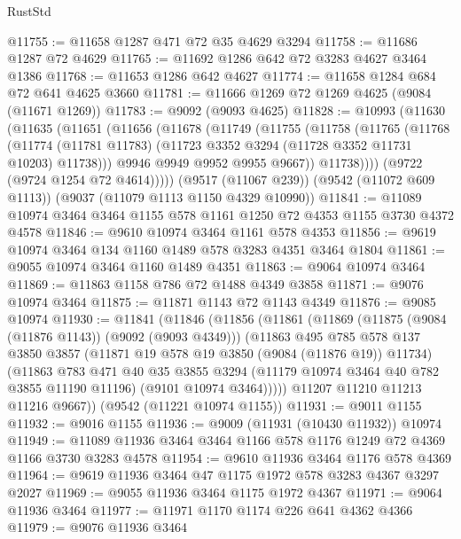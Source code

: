 \begin{lexlean}{RustStd}
\begin{coremodule}
@11755 := @11658 @1287 @471 @72 @35 @4629 @3294
@11758 := @11686 @1287 @72 @4629
@11765 := @11692 @1286 @642 @72 @3283 @4627 @3464 @1386
@11768 := @11653 @1286 @642 @4627
@11774 := @11658 @1284 @684 @72 @641 @4625 @3660
@11781 := @11666 @1269 @72 @1269 @4625 (@9084 (@11671 @1269))
@11783 := @9092 (@9093 @4625)
@11828 := @10993
    (@11630
      (@11635
        (@11651
          (@11656
            (@11678
              (@11749
                (@11755
                  (@11758
                    (@11765
                      (@11768
                        (@11774
                          (@11781 @11783)
                          (@11723 @3352 @3294 (@11728 @3352 @11731 @10203) @11738)))
                      @9946
                      @9949
                      @9952
                      @9955
                      @9667))
                  @11738))))
          (@9722 (@9724 @1254 @72 @4614)))))
    (@9517 (@11067 @239))
    (@9542 (@11072 @609 @1113))
    (@9037 (@11079 @1113 @1150 @4329 @10990))
@11841 := @11089 @10974 @3464 @3464 @1155 @578 @1161 @1250 @72 @4353 @1155 @3730 @4372 @4578
@11846 := @9610 @10974 @3464 @1161 @578 @4353
@11856 := @9619 @10974 @3464 @134 @1160 @1489 @578 @3283 @4351 @3464 @1804
@11861 := @9055 @10974 @3464 @1160 @1489 @4351
@11863 := @9064 @10974 @3464
@11869 := @11863 @1158 @786 @72 @1488 @4349 @3858
@11871 := @9076 @10974 @3464
@11875 := @11871 @1143 @72 @1143 @4349
@11876 := @9085 @10974
@11930 := @11841
    (@11846
      (@11856
        (@11861
          (@11869
            (@11875 (@9084 (@11876 @1143)) (@9092 (@9093 @4349)))
            (@11863
              @495
              @785
              @578
              @137
              @3850
              @3857
              (@11871 @19 @578 @19 @3850 (@9084 (@11876 @19)) @11734)
              (@11863
                @783
                @471
                @40
                @35
                @3855
                @3294
                (@11179 @10974 @3464 @40 @782 @3855 @11190 @11196)
                (@9101 @10974 @3464)))))
        @11207
        @11210
        @11213
        @11216
        @9667))
    (@9542 (@11221 @10974 @1155))
@11931 := @9011 @1155
@11932 := @9016 @1155
@11936 := @9009 (@11931 (@10430 @11932)) @10974
@11949 := @11089 @11936 @3464 @3464 @1166 @578 @1176 @1249 @72 @4369 @1166 @3730 @3283 @4578
@11954 := @9610 @11936 @3464 @1176 @578 @4369
@11964 := @9619 @11936 @3464 @47 @1175 @1972 @578 @3283 @4367 @3297 @2027
@11969 := @9055 @11936 @3464 @1175 @1972 @4367
@11971 := @9064 @11936 @3464
@11977 := @11971 @1170 @1174 @226 @641 @4362 @4366
@11979 := @9076 @11936 @3464

\end{coremodule}
\end{lexlean}
